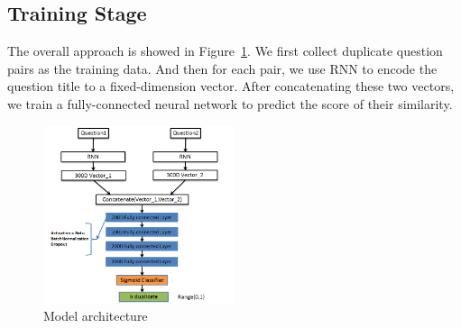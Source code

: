 	
	
	

	
	\subsection{Training Stage}	 
	 The overall approach is showed in Figure~\ref{fig:DSSM}.
	 We first collect duplicate question pairs as the training data. 
	 And then for each pair, we use RNN to encode the question title to a fixed-dimension vector.
	 After concatenating these two vectors, we train a fully-connected neural network to predict the score of their similarity.
	
	\begin{figure}[!h]
		\centering
		\includegraphics[width = 0.5\textwidth]{figures/modelac.png}
		\caption{Model architecture}
		\label{fig:DSSM}
	\end{figure}
	
	
